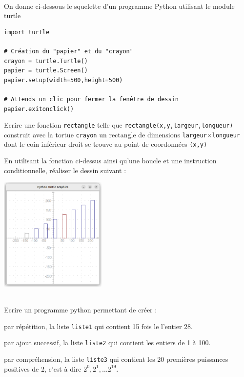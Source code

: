 \documentclass[11pt,a4paper]{article}
\begin{document}
 \\
On donne ci-dessous le squelette d'un programme Python utilisant le module turtle
\begin{lstlisting}
import turtle

# Création du "papier" et du "crayon"
crayon = turtle.Turtle()
papier = turtle.Screen()
papier.setup(width=500,height=500)

# Attends un clic pour fermer la fenêtre de dessin
papier.exitonclick()
\end{lstlisting}
\QListe
\item Ecrire une fonction {\tt rectangle} telle que {\tt rectangle(x,y,largeur,longueur)}  construit avec la tortue {\tt crayon} un rectangle de dimensions {\tt largeur}$\times${\tt longueur} dont le coin inférieur droit se trouve au point de coordonnées {\tt (x,y)}
\item En utilisant la fonction ci-dessus ainsi qu'une boucle et une instruction conditionnelle, réaliser le dessin suivant :
\begin{center}
    \includegraphics[width=200px]{TermD1-1.eps}
\end{center}
\FinListe

\\
Ecrire un programme python permettant de créer :
\QListe
\item par répétition, la liste {\tt liste1} qui contient 15 fois le l'entier 28.
\item par ajout successif, la liste {\tt liste2} qui contient les entiers de 1 à 100.
\item par compréhension, la liste {\tt liste3} qui contient les 20 premières puissances positives de 2, c'est à dire $2^0, 2^1, \dots 2^{19}$.
\FinListe
\end{document}
